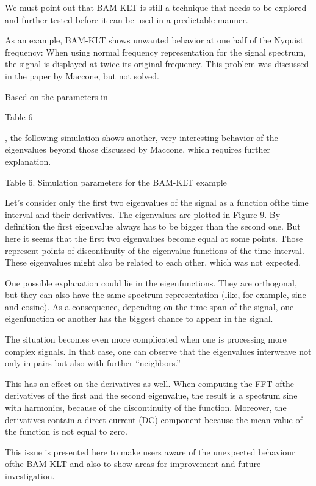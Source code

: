 \documentclass[12pt]{report}
\begin{document}
We must point out that BAM-KLT is still a technique that needs to be explored and further tested before it can be used in a predictable manner.

As an example, BAM-KLT shows unwanted behavior at one half of the Nyquist frequency: When using normal frequency representation for the signal spectrum, the signal is displayed at twice its original frequency. This problem was discussed in the paper by Maccone, but not solved.

Based on the parameters in \begin{normalsize}
	\color{red}Table 6
\end{normalsize}, the following simulation shows another, very interesting behavior of the eigenvalues beyond those discussed by Maccone, which requires further explanation.
\begin{center}
	\color{blue}Table 6. Simulation parameters for the BAM-KLT example
\end{center}
Let's consider only the first two eigenvalues of the signal as a function ofthe time interval and their derivatives. The eigenvalues are plotted in Figure 9. By definition the first eigenvalue always has to be bigger than the second one. But here it seems that the first two eigenvalues become equal at some points. Those represent points of discontinuity of the eigenvalue functions of the time interval. These eigenvalues might also be related to each other, which was not expected.

One possible explanation could lie in the eigenfunctions. They are orthogonal, but they can also have the same spectrum representation (like, for example, sine and cosine). As a consequence, depending on the time span of the signal, one eigenfunction or another has the biggest chance to appear in the signal.

The situation becomes even more complicated when one is processing more complex signals. In that case, one can observe that the eigenvalues interweave not only in pairs but also with further “neighbors.”

This has an effect on the derivatives as well. When computing the FFT ofthe derivatives of the first and the second eigenvalue, the result is a spectrum sine with harmonics, because of the discontinuity of the function. Moreover, the derivatives contain a direct current (DC) component because the mean value of the function is not equal to zero.

This issue is presented here to make users aware of the unexpected behaviour ofthe BAM-KLT and also to show areas for improvement and future investigation.
\end{document}
